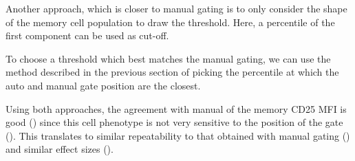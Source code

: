 Another approach, which is closer to manual gating is to only consider the shape of the memory cell population
to draw the threshold. Here, a percentile of the first component can be used as cut-off.

To choose a threshold which best matches the manual gating,
we can use the method described in the previous section of picking the percentile at which the auto and manual gate position are the closest.

Using both approaches, the agreement with manual of the memory CD25 MFI is good
()
since this cell phenotype is not very sensitive to the position of the  gate
().  
This translates to similar repeatability to that obtained with manual gating () and similar effect sizes
().

